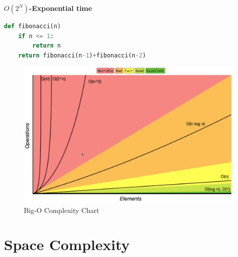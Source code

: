 \documentclass[10pt,letterpaper]{article}
\begin{document}
\textbf{$O(2^{N})$-Exponential time}
\begin{lstlisting}[language=Python]
def fibonacci(n)
	if n <= 1:
		return n
	return fibonacci(n-1)+fibonacci(n-2)
\end{lstlisting}

\begin{figure}[hbtp]
\centering
\includegraphics[scale=0.2]{images/Screenshot from 2021-07-01 01-23-01.png}
\caption{Big-O Complexity Chart}
\end{figure}

\section{Space Complexity}
\end{document}
